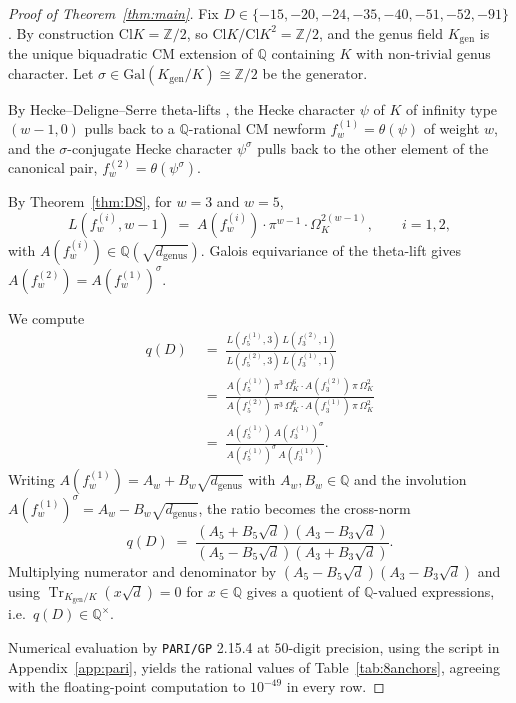 \documentclass[11pt,a4paper]{amsart}
\theoremstyle{plain}
\theoremstyle{definition}
\newcommand{\Q}{\mathbb{Q}}
\newcommand{\Z}{\mathbb{Z}}
\newcommand{\Gal}{\mathrm{Gal}}
\newcommand{\Cl}{\mathrm{Cl}}
\newcommand{\Kgen}{K_{\mathrm{gen}}}
\DeclareMathOperator{\Tr}{Tr}
\begin{document}
\begin{proof}[Proof of Theorem~\ref{thm:main}]
Fix $D \in \{-15, -20, -24, -35, -40, -51, -52, -91\}$. By construction
$\Cl K = \Z/2$, so $\Cl K / \Cl K^2 = \Z/2$, and the genus field
$\Kgen$ is the unique biquadratic CM extension of $\Q$ containing $K$
with non-trivial genus character. Let
$\sigma \in \Gal(\Kgen/K) \cong \Z/2$ be the generator.

By Hecke--Deligne--Serre theta-lifts \cite{Deligne1971,Serre1977,Ribet1977},
the Hecke character $\psi$ of $K$ of infinity type $(w-1, 0)$ pulls back
to a $\Q$-rational CM newform $f_w^{(1)} = \theta(\psi)$ of weight $w$,
and the $\sigma$-conjugate Hecke character $\psi^\sigma$ pulls back to
the other element of the canonical pair, $f_w^{(2)} = \theta(\psi^\sigma)$.

By Theorem~\ref{thm:DS}, for $w = 3$ and $w = 5$,
\[
  L(f_w^{(i)}, w-1) \;=\; A(f_w^{(i)}) \cdot \pi^{w-1} \cdot \Omega_K^{2(w-1)},
  \qquad i = 1, 2,
\]
with $A(f_w^{(i)}) \in \Q(\sqrt{d_{\mathrm{genus}}})$. Galois equivariance
of the theta-lift gives
$A(f_w^{(2)}) = A(f_w^{(1)})^\sigma$.

We compute
\begin{align*}
  q(D) &\;=\; \frac{L(f_5^{(1)}, 3)\, L(f_3^{(2)}, 1)}{L(f_5^{(2)}, 3)\, L(f_3^{(1)}, 1)} \\
       &\;=\; \frac{A(f_5^{(1)})\,\pi^3\,\Omega_K^6 \cdot A(f_3^{(2)})\,\pi\,\Omega_K^2}
                  {A(f_5^{(2)})\,\pi^3\,\Omega_K^6 \cdot A(f_3^{(1)})\,\pi\,\Omega_K^2} \\
       &\;=\; \frac{A(f_5^{(1)})\, A(f_3^{(1)})^\sigma}{A(f_5^{(1)})^\sigma\, A(f_3^{(1)})}.
\end{align*}
Writing $A(f_w^{(1)}) = A_w + B_w \sqrt{d_{\mathrm{genus}}}$ with
$A_w, B_w \in \Q$ and the involution
$A(f_w^{(1)})^\sigma = A_w - B_w \sqrt{d_{\mathrm{genus}}}$, the ratio
becomes the cross-norm
\[
  q(D) \;=\; \frac{(A_5 + B_5\sqrt d)(A_3 - B_3\sqrt d)}{(A_5 - B_5\sqrt d)(A_3 + B_3\sqrt d)}.
\]
Multiplying numerator and denominator by
$(A_5 - B_5 \sqrt d)(A_3 - B_3 \sqrt d)$ and using
$\Tr_{\Kgen/K}(x \sqrt d) = 0$ for $x \in \Q$ gives a quotient of
$\Q$-valued expressions, i.e.\ $q(D) \in \Q^\times$.

Numerical evaluation by \texttt{PARI/GP} 2.15.4 at $50$-digit precision,
using the script in Appendix~\ref{app:pari}, yields the rational values
of Table~\ref{tab:8anchors}, agreeing with the floating-point
computation to $10^{-49}$ in every row.
\end{proof}
\end{document}
